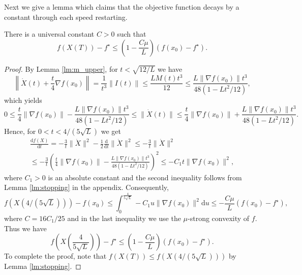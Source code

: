 \documentclass[twoside,11pt]{article}
\newcommand{\norm}[1]{\|#1\|}
\renewcommand{\d}{{\mathrm{d}}}
\begin{document}
Next we give a lemma which claims that the objective function decays by a constant through each speed restarting.
\begin{lemma}\label{lm:decayfast}
There is a universal constant $C > 0$ such that
\begin{equation}\nonumber
f(X(T)) - f^\star \le \left( 1 - \frac{C\mu}{L} \right) (f(x_0) - f^\star).
\end{equation}

\end{lemma}
\begin{proof}
By Lemma \ref{lm:m_upper}, for $t < \sqrt{12/L}$ we have
\begin{equation}\nonumber
\left\| \dot X(t) + \frac{t}{4}\nabla f(x_0) \right\| = \frac{1}{t^3}\|I(t)\|\le \frac{LM(t)t^3}{12} \le \frac{L\norm{\nabla f(x_0)}t^3}{48(1 - Lt^2/12)},
\end{equation}
which yields
\begin{equation}\label{eq:close}
0 \le \frac{t}{4}\norm{\nabla f(x_0)} -  \frac{L\norm{\nabla f(x_0)}t^3}{48(1 - Lt^2/12)} \le \|\dot X(t)\| \le \frac{t}{4}\norm{\nabla f(x_0)} +  \frac{L\norm{\nabla f(x_0)}t^3}{48(1 - Lt^2/12)}.
\end{equation}
Hence, for $0 < t < 4/(5\sqrt{L})$ we get
\begin{multline}\nonumber
\frac{\d f(X)}{\d t} = -\frac{3}{t}\norm{\dot X}^2 - \frac{1}{2}\frac{\d}{\d t}\norm{\dot X}^2 \le -\frac{3}{t}\norm{\dot X}^2   \\
\le -\frac{3}{t} \left(\frac{t}{4}\norm{\nabla f(x_0)} -  \frac{L\norm{\nabla f(x_0)}t^3}{48(1 - Lt^2/12)}\right)^2 \le - C_1t\norm{\nabla f(x_0)}^2,
\end{multline}
where $C_1 > 0$ is an absolute constant and the second inequality follows from Lemma \ref{lm:stopping} in the appendix. Consequently,
\[
f\left(X(4/(5\sqrt{L}))\right) - f(x_0) \le \int_{0}^{\frac{4}{5\sqrt{L}}}-C_1u\norm{\nabla f(x_0)}^2\d u \le -\frac{C\mu}{L}(f(x_0)-f^\star),
\]
where $C = 16C_1/25$ and in the last inequality we use the $\mu$-strong convexity of $f$. Thus we have
\[
f\left( X \left(\frac{4}{5\sqrt{L}}\right)\right) - f^\star \le \left( 1 -\frac{C\mu}{L}\right)(f(x_0)-f^\star).
\]
To complete the proof, note that $f(X(T)) \le f(X(4/(5\sqrt{L})))$ by Lemma \ref{lm:stopping}.

\end{proof}
\end{document}
